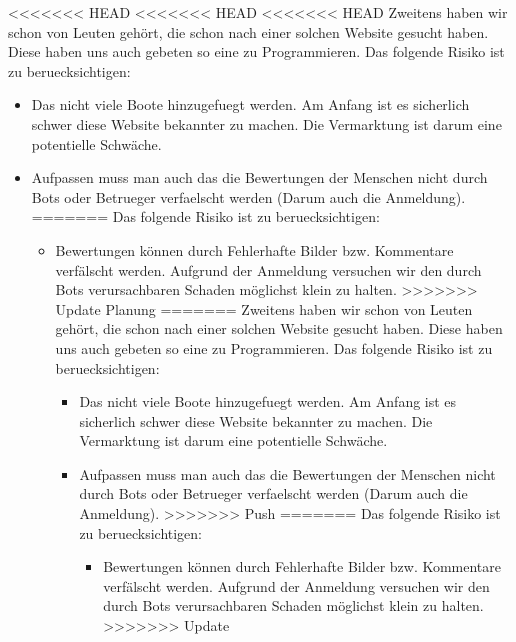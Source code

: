 \documentclass[12pt]{article}
\theoremstyle{definition}
\begin{document}
<<<<<<< HEAD
<<<<<<< HEAD
<<<<<<< HEAD
Zweitens haben wir schon von Leuten gehört, die schon nach einer solchen Website gesucht haben. Diese haben uns auch gebeten so eine zu Programmieren.
Das folgende Risiko ist zu beruecksichtigen:
\begin{itemize}
\item Das nicht viele Boote hinzugefuegt werden. Am Anfang ist es sicherlich schwer diese Website bekannter zu machen. Die Vermarktung ist darum eine potentielle Schwäche.
\item Aufpassen muss man auch das die Bewertungen der Menschen nicht durch Bots oder Betrueger verfaelscht werden (Darum auch die Anmeldung).
=======
Das folgende Risiko ist zu beruecksichtigen:
\begin{itemize}
\item Bewertungen können durch Fehlerhafte Bilder bzw. Kommentare verfälscht werden. Aufgrund der Anmeldung versuchen wir den durch Bots verursachbaren Schaden möglichst klein zu halten.
>>>>>>> Update Planung
=======
Zweitens haben wir schon von Leuten gehört, die schon nach einer solchen Website gesucht haben. Diese haben uns auch gebeten so eine zu Programmieren.
Das folgende Risiko ist zu beruecksichtigen:
\begin{itemize}
\item Das nicht viele Boote hinzugefuegt werden. Am Anfang ist es sicherlich schwer diese Website bekannter zu machen. Die Vermarktung ist darum eine potentielle Schwäche.
\item Aufpassen muss man auch das die Bewertungen der Menschen nicht durch Bots oder Betrueger verfaelscht werden (Darum auch die Anmeldung).
>>>>>>> Push
=======
Das folgende Risiko ist zu beruecksichtigen:
\begin{itemize}
\item Bewertungen können durch Fehlerhafte Bilder bzw. Kommentare verfälscht werden. Aufgrund der Anmeldung versuchen wir den durch Bots verursachbaren Schaden möglichst klein zu halten.
>>>>>>> Update
\end{itemize}

\pagebreak


\end{itemize}
\end{itemize}
\end{itemize}
\end{document}
